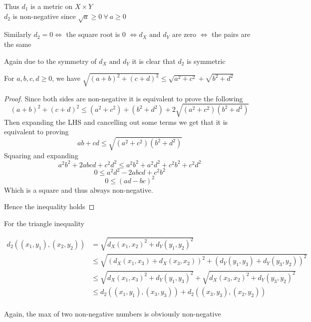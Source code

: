 \documentclass{article}
\begin{document}
\begin{problem}
\begin{solution}
	Thus \( d_1 \) is a metric on \( X \times Y \)
	\\

	\( d_{2} \) is non-negative since \( \sqrt{a} \ge 0 \ \forall \ a \ge 0 \)

	Similarly \( d_{2} = 0 \iff \) the square root is 0 \( \iff d_X \text{ and } d_Y \) are zero \( \iff \) the pairs are the same

	Again due to the symmetry of \( d_X \text{ and } d_Y \) it is clear that \( d_2 \) is symmetric

	\begin{lemma}
		For \( a,b,c,d \ge 0 \), we have \( \sqrt{(a+b)^2 + (c+d)^2} \le \sqrt{a^2+c^2} + \sqrt{b^2+d^2} \)

		\begin{proof}
			Since both sides are non-negative it is equivalent to prove the following
			\[
				(a+b)^2+(c+d)^2 \le (a^2+c^2) + (b^2+d^2) + 2\sqrt{(a^2+c^2)(b^2+d^2)}
			\]
			Then expanding the LHS and cancelling out some terms we get that it is equivalent to proving
			\[
				ab + cd \le \sqrt{(a^2+c^2)(b^2+d^2)}
			\]
			Squaring and expanding
			\[
				a^2b^2+2abcd+c^2d^2 \le a^2b^2+a^2d^2+c^2b^2+c^2d^2
			\]
			\[
				0 \le a^2d^2-2abcd +c^2b^2
			\]
			\[
				0 \le (ad-bc)^2
			\]
			Which is a square and thus always non-negative.

			Hence the inequality holds
		\end{proof}
	\end{lemma}

	For the triangle inequality

	\begin{align*}
		d_{2}((x_{1},y_{1}), (x_{2},y_{2})) & = \sqrt{d_X(x_{1},x_{2})^2 + d_Y(y_{1},y_{2})^2}                                                    \\
		                                    & \le \sqrt{(d_X(x_{1},x_{3}) + d_X(x_{3},x_{2}))^2 + (d_Y(y_{1},y_{3}) + d_Y(y_{3},y_{2}))^2}        \\
		                                    & \le \sqrt{d_X(x_{1},x_{3})^2 + d_Y(y_{1},y_{3})^2} + \sqrt{d_X(x_{3},x_{2})^2 + d_Y(y_{3},y_{2})^2} \\
		                                    & \le d_{2}((x_{1},y_{1}),(x_{3},y_{3})) + d_{2}((x_{3},y_{3}),(x_{2},y_{2}))
	\end{align*}
	\\

	Again, the max of two non-negative numbers is obviously non-negative


\end{solution}
\end{problem}
\end{document}
